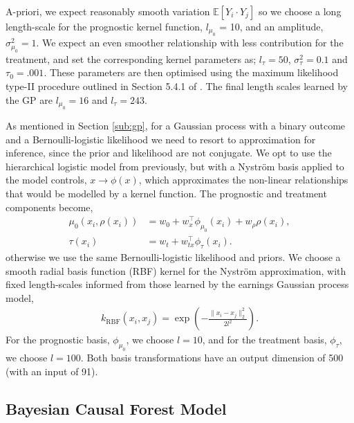\documentclass[12pt, a4paper]{article}
\begin{document}
A-priori, we expect reasonably smooth variation $\mathbb{E}[Y_i \cdot Y_j]$ so
we choose a long length-scale for the prognostic kernel function, $l_{\mu_0}$ =
10, and an amplitude, $\sigma^2_{\mu_0} = 1$. We expect an even smoother
relationship with less contribution for the treatment, and set the
corresponding kernel parameters as; $l_\tau = 50$, $\sigma^2_\tau = 0.1$ and
$\tau_0 = .001$. These parameters are then optimised using the maximum
likelihood type-II procedure outlined in Section 5.4.1 of \citet{williams2006}.
The final length scales learned by the GP are $l_{\mu_0} = 16$ and $l_\tau = 243$.

As mentioned in Section \ref{sub:gp}, for a Gaussian process with a binary
outcome and a Bernoulli-logistic likelihood we need to resort to approximation
for inference, since the prior and likelihood are not conjugate. We opt to use
the hierarchical logistic model from previously, but with a Nystr\"om basis
applied to the model controls, $x \to \phi(x)$, which approximates the
non-linear relationships that would be modelled by a kernel function. The
prognostic and treatment components become,
\begin{align*}
  \mu_0(x_i, \rho(x_i)) &= w_0 + w_x^\top \phi_{\mu_0}(x_i) + w_\rho \rho(x_i), \\
  \tau(x_i) &= w_t + w_{tx}^\top \phi_{\tau}(x_i).
\end{align*}
otherwise we use the same Bernoulli-logistic likelihood and priors. We choose a
smooth radial basis function (RBF) kernel for the Nystr\"om approximation, with
fixed length-scales informed from those learned by the earnings Gaussian
process model,
\begin{align*}
  k_{\text{RBF}}(x_i, x_j) = \exp\left(-\frac{\|x_i - x_j\|^2_2}{2 l^2}\right). 
\end{align*}
For the prognostic basis, $\phi_{\mu_0}$, we choose $l=10$, and for the treatment
basis, $\phi_\tau$, we choose $l=100$. Both basis transformations have an output
dimension of 500 (with an input of 91). 


\subsection{Bayesian Causal Forest Model}
\end{document}
